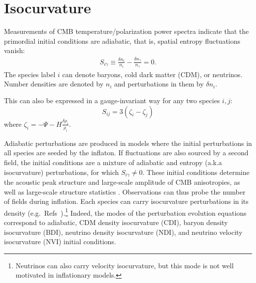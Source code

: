 \section{Isocurvature}
Measurements of CMB temperature/polarization power spectra indicate that the primordial initial conditions are adiabatic, that is, spatial entropy fluctuations vanish:
\begin{align}
S_{i \gamma}\equiv \frac{\delta n_{i}}{n_{i}}-\frac{\delta n_{\gamma}}{n_{\gamma}} =0.\end{align} The species label $i$ can denote baryons, cold dark matter (CDM), or neutrinos. Number densities are denoted by $n_{i}$ and perturbations in them by $\delta n_{i}$.

This can also be expressed in a gauge-invariant way for any two species $i,j$:
\begin{equation}
S_{ij}=3(\zeta_i-\zeta_j)
\end{equation}
where $\zeta_i = -\Psi - H \frac{\delta\rho_i}{\dot{\rho}_i}$.

Adiabatic perturbations are produced in models where the initial perturbations in all species are seeded by the inflaton. If fluctuations are also sourced by a second field, the initial conditions are a mixture of adiabatic and entropy (a.k.a isocurvature) perturbations, for which $S_{i\gamma}\neq 0$. These initial conditions determine the acoustic peak structure and large-scale amplitude of CMB anisotropies, as well as large-scale structure statistics \cite{Bond:1984fp,Kodama:1986fg,Kodama:1986ud,Hu:1994jd,Moodley:2004nz,Bean:2006qz}. Observations can thus probe the number of fields during inflation. 
\label{sec:isosec}
Each species can carry isocurvature perturbations in its density (e.g.\ Refs~\cite{Bucher:1999re,Bucher:2004an,Moodley:2004nz}).\footnote{Neutrinos can also carry velocity isocurvature, but this mode is not well motivated in inflationary models.} Indeed, the modes of the perturbation evolution equations correspond to adiabatic, CDM density isocurvature (CDI), baryon density isocurvature (BDI), neutrino density isocurvature (NDI), and neutrino velocity isocurvature (NVI) initial conditions. 


